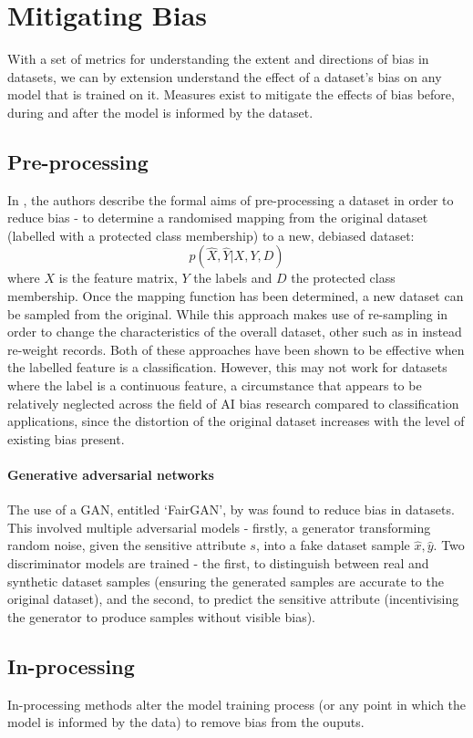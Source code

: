 \documentclass[conference]{IEEEtran}
\begin{document}
\section{Mitigating Bias}
\label{sec:mitigation}
With a set of metrics for understanding the extent and directions of bias in datasets, we can by extension understand the effect of a dataset's bias on any model that is trained on it. Measures exist to mitigate the effects of bias before, during and after the model is informed by the dataset.
\subsection{Pre-processing}
In \cite{NIPS2017_9a49a25d}, the authors describe the formal aims of pre-processing a dataset in order to reduce bias - to determine a randomised mapping from the original dataset (labelled with a protected class membership) to a new, debiased dataset: \[p(\hat{X}, \hat{Y} | X, Y, D)\] where $X$ is the feature matrix, $Y$ the labels and $D$ the protected class membership. Once the mapping function has been determined, a new dataset can be sampled from the original. While this approach makes use of re-sampling in order to change the characteristics of the overall dataset, other such as in \cite{preprocessing} instead re-weight records. Both of these approaches have been shown to be effective when the labelled feature is a classification. However, this may not work for datasets where the label is a continuous feature, a circumstance that appears to be relatively neglected across the field of AI bias research compared to classification applications, since the distortion of the original dataset increases with the level of existing bias present.
\paragraph{Generative adversarial networks} The use of a GAN, entitled `FairGAN', by \cite{DBLP:journals/corr/abs-1805-11202} was found to reduce bias in datasets. This involved multiple adversarial models - firstly, a generator transforming random noise, given the sensitive attribute $s$, into a fake dataset sample $\hat{x}, \hat{y}$. Two discriminator models are trained - the first, to distinguish between real and synthetic dataset samples (ensuring the generated samples are accurate to the original dataset), and the second, to predict the sensitive attribute (incentivising the generator to produce samples without visible bias).
\subsection{In-processing}
In-processing methods alter the model training process (or any point in which the model is informed by the data) to remove bias from the ouputs. 
\end{document}
